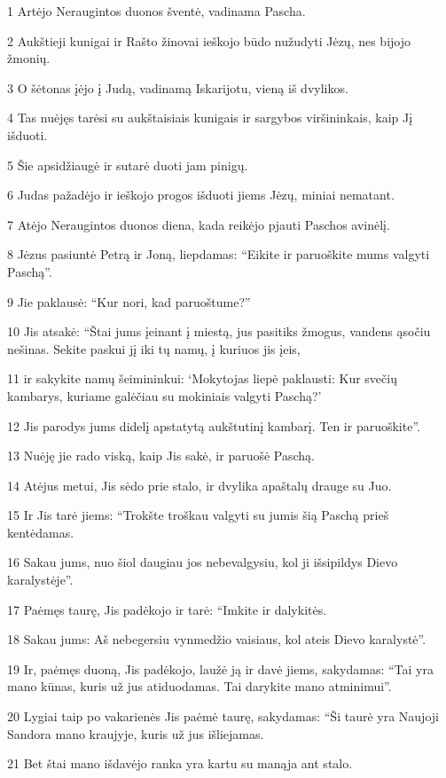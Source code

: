 \par 1 Artėjo Neraugintos duonos šventė, vadinama Pascha. 
\par 2 Aukštieji kunigai ir Rašto žinovai ieškojo būdo nužudyti Jėzų, nes bijojo žmonių. 
\par 3 O šėtonas įėjo į Judą, vadinamą Iskarijotu, vieną iš dvylikos. 
\par 4 Tas nuėjęs tarėsi su aukštaisiais kunigais ir sargybos viršininkais, kaip Jį išduoti. 
\par 5 Šie apsidžiaugė ir sutarė duoti jam pinigų. 
\par 6 Judas pažadėjo ir ieškojo progos išduoti jiems Jėzų, miniai nematant. 
\par 7 Atėjo Neraugintos duonos diena, kada reikėjo pjauti Paschos avinėlį. 
\par 8 Jėzus pasiuntė Petrą ir Joną, liepdamas: “Eikite ir paruoškite mums valgyti Paschą”. 
\par 9 Jie paklausė: “Kur nori, kad paruoštume?” 
\par 10 Jis atsakė: “Štai jums įeinant į miestą, jus pasitiks žmogus, vandens ąsočiu nešinas. Sekite paskui jį iki tų namų, į kuriuos jis įeis, 
\par 11 ir sakykite namų šeimininkui: ‘Mokytojas liepė paklausti: Kur svečių kambarys, kuriame galėčiau su mokiniais valgyti Paschą?’ 
\par 12 Jis parodys jums didelį apstatytą aukštutinį kambarį. Ten ir paruoškite”. 
\par 13 Nuėję jie rado viską, kaip Jis sakė, ir paruošė Paschą. 
\par 14 Atėjus metui, Jis sėdo prie stalo, ir dvylika apaštalų drauge su Juo. 
\par 15 Ir Jis tarė jiems: “Trokšte troškau valgyti su jumis šią Paschą prieš kentėdamas. 
\par 16 Sakau jums, nuo šiol daugiau jos nebevalgysiu, kol ji išsipildys Dievo karalystėje”. 
\par 17 Paėmęs taurę, Jis padėkojo ir tarė: “Imkite ir dalykitės. 
\par 18 Sakau jums: Aš nebegersiu vynmedžio vaisiaus, kol ateis Dievo karalystė”. 
\par 19 Ir, paėmęs duoną, Jis padėkojo, laužė ją ir davė jiems, sakydamas: “Tai yra mano kūnas, kuris už jus atiduodamas. Tai darykite mano atminimui”. 
\par 20 Lygiai taip po vakarienės Jis paėmė taurę, sakydamas: “Ši taurė yra Naujoji Sandora mano kraujyje, kuris už jus išliejamas. 
\par 21 Bet štai mano išdavėjo ranka yra kartu su manąja ant stalo. 
